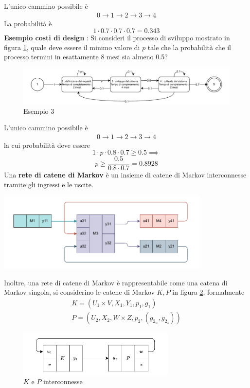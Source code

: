 \documentclass[10pt, letterpaper]{report}
\begin{document}
L'unico cammino possibile è$$ \begin{matrix}
    0\rightarrow1\rightarrow2\rightarrow3\rightarrow4
\end{matrix}$$ 
La probabilità è 
$$ 1\cdot 0.7\cdot 0.7 \cdot 0.7 = 0.343$$
\textbf{Esempio costi di design} : Si consideri il processo di sviluppo 
mostrato in figura \ref{esempioDTMC3}, quale deve essere il minimo valore di $p$ tale che 
la probabilità che il processo termini in esattamente 8 mesi sia almeno 0.5?\begin{figure}[h!]
    \centering 
    \includegraphics[width=1\textwidth ]{images/esempioDTMC3.pdf}
    \caption{Esempio 3}
    \label{esempioDTMC3}
\end{figure}\acc
L'unico cammino possibile è $$ \begin{matrix}
    0\rightarrow1\rightarrow2\rightarrow3\rightarrow4
\end{matrix}$$ 
la cui probabilità deve essere
$$ 1\cdot p\cdot 0.8 \cdot 0.7 \ge 0.5\implies $$
$$ p\ge \frac{0.5}{0.8\cdot 0.7}=0.8928$$
Una \textbf{rete di catene di Markov} è un insieme di catene di Markov interconnesse 
tramite gli ingressi e le uscite.\begin{center}
    \includegraphics[width=0.8\textwidth ]{images/cateneInterconnesse.pdf}
\end{center}
Inoltre, una rete di catene di Markov è rappresentabile come 
una catena di Markov singola, si considerino le catene di Markov $K,P$ in figura 
\ref{cateneInterconnesse}, formalmente
$$ \begin{matrix}
    K=(U_1\times V, X_1,Y_1,p_1,g_1)\\ 
    P=(U_2, X_2,W\times Z,p_2,(g_{2_w},g_{2_z}))
\end{matrix}$$
\begin{figure}[h!]
    \centering 
    \includegraphics[width=0.7\textwidth ]{images/cateneInterconnesse2.pdf}
    \caption{$K$ e $P$ interconnesse}
    \label{cateneInterconnesse}
\end{figure}\acc
\end{document}
